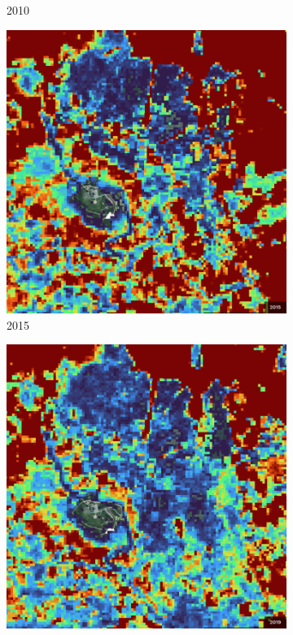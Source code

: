 \begin{figure}[H]
\begin{subfigure}[t]{0.22\textwidth}
        \caption{2010}
        \end{subfigure}
        \hfill
        \begin{subfigure}[t]{0.22\textwidth}
        \centering
        \includegraphics[width=\linewidth,height=\linewidth]{figs_06/brocken_2015.png}
        \caption{2015}
        \end{subfigure}
        \hfill
        \begin{subfigure}[t]{0.22\textwidth}
        \centering
        \includegraphics[width=\linewidth,height=\linewidth]{figs_06/brocken_2019.png}

\end{subfigure}
\end{figure}
